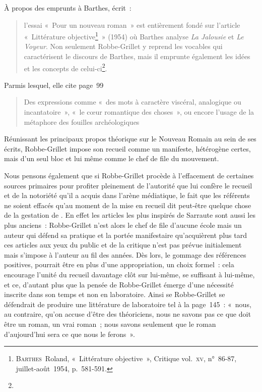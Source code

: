 \documentclass[12pt, a4paper]{article}
\begin{document}
À propos des emprunts à Barthes, \galia{} écrit~:
\begin{quote}
l’essai «~Pour un nouveau roman~» est entièrement fondé sur l’article «~Littérature objective\footnote{\textsc{Barthes}~Roland, «~Littérature objective~», Critique vol.~\textsc{xv}, n°~86-87, juillet-août~1954, p.~581-591.}~» (1954) où Barthes analyse \textit{La Jalousie} et \textit{Le Voyeur}. Non seulement Robbe-Grillet y reprend les vocables qui caractérisent le discours de Barthes, mais il emprunte également les idées et les concepts de celui-ci\footnote{}.    
\end{quote}
Parmis lesquel, elle cite page~99
\begin{quote}
Des expressions comme «~des mots à caractère viscéral, analogique ou incantatoire~», «~le cœur romantique des choses~», ou encore l’usage de la métaphore des fouilles archéologiques
\end{quote}

Réunissant les principaux propos théorique sur le Nouveau Romain au sein de ses écrits, Robbe-Grillet impose son recueil comme un manifeste, hétérogène certes, mais d'un seul bloc et lui même comme le chef de file du mouvement.










Nous pensons également que si Robbe-Grillet procède à l'effacement de certaines sources primaires pour profiter pleinement de l'autorité que lui confère le recueil et de la notoriété qu'il a acquis dans l'arène médiatique, le fait que les référents ne soient effacés qu'au moment de la mise en recueil dit peut-être quelque chose de la gestation de \punr. En effet les articles les plus inspirés de Sarraute sont aussi les plus anciens~: Robbe-Grillet n'est alors le chef de file d'aucune école mais un auteur qui défend sa pratique et la portée manifestaire qu'acquièrent plus tard ces articles aux yeux du public et de la critique n'est pas prévue initialement mais s'impose à l'auteur au fil des années. Dès lors, le gommage des références positives, pourrait être en plus d'une appropriation, un choix formel~: cela encourage l'unité du recueil davantage clôt sur lui-même, se suffisant à lui-même, et ce, d'autant plus que la pensée de Robbe-Grillet émerge d'une nécessité inscrite dans son temps et non en laboratoire. Ainsi se Robbe-Grillet se défendrait de produire une littérature de laboratoire tel à la page~145~: «~nous, au contraire, qu’on accuse d’être des théoriciens, nous ne savons pas ce que doit être un roman, un vrai roman~; nous savons seulement que le roman d’aujourd’hui sera ce que nous le ferons~».
\end{document}
